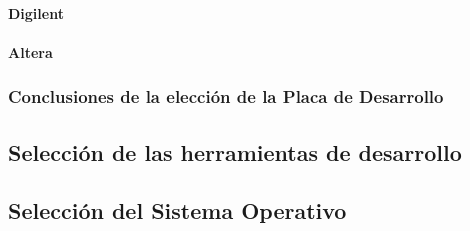 				\paragraph{Digilent}
				
				 	 
				\paragraph{Altera}
				
				
 				\subsubsection{Conclusiones de la elección de la Placa de Desarrollo}
 			
 			\subsection{Selección de las herramientas de desarrollo} 	 
 		
 		
 			\subsection{Selección del Sistema Operativo}
 			